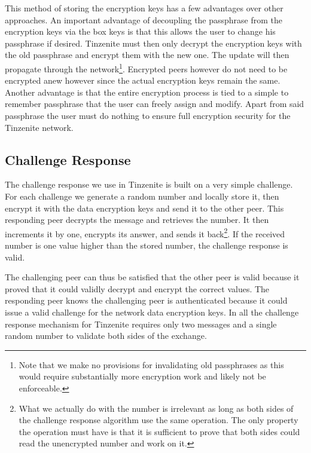 This method of storing the encryption keys has a few advantages over other approaches.
An important advantage of decoupling the passphrase from the encryption keys via the box keys is that this allows the user to change his passphrase if desired.
Tinzenite must then only decrypt the encryption keys with the old passphrase and encrypt them with the new one.
The update will then propagate through the network\footnote{Note that we make no provisions for invalidating old passphrases as this would require substantially more encryption work and likely not be enforceable.}.
Encrypted peers however do not need to be encrypted anew however since the actual encryption keys remain the same.
Another advantage is that the entire encryption process is tied to a simple to remember passphrase that the user can freely assign and modify.
Apart from said passphrase the user must do nothing to ensure full encryption security for the Tinzenite network.

\subsection{Challenge Response}
\label{sub:Challenge Response}

The challenge response we use in Tinzenite is built on a very simple challenge.
For each challenge we generate a random number and locally store it, then encrypt it with the data encryption keys and send it to the other peer.
This responding peer decrypts the message and retrieves the number.
It then increments it by one, encrypts its answer, and sends it back\footnote{What we actually do with the number is irrelevant as long as both sides of the challenge response algorithm use the same operation. The only property the operation must have is that it is sufficient to prove that both sides could read the unencrypted number and work on it.}.
If the received number is one value higher than the stored number, the challenge response is valid.

The challenging peer can thus be satisfied that the other peer is valid because it proved that it could validly decrypt and encrypt the correct values.
The responding peer knows the challenging peer is authenticated because it could issue a valid challenge for the network data encryption keys.
In all the challenge response mechanism for Tinzenite requires only two messages and a single random number to validate both sides of the exchange.
